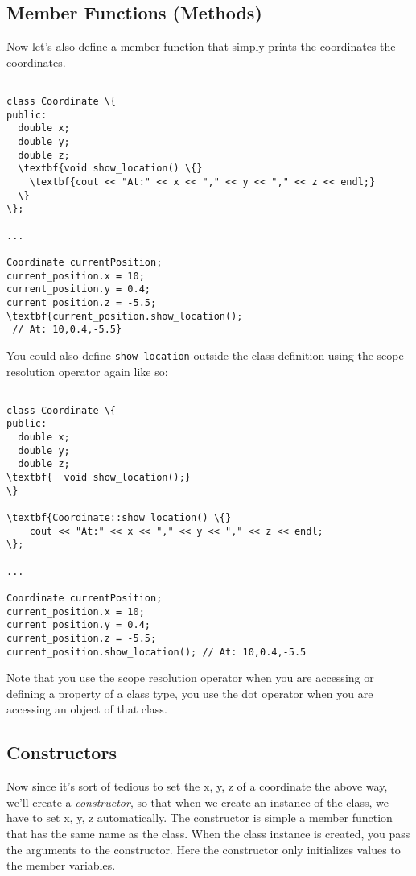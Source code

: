 \documentclass{IEEEtran}
\begin{document}
\subsection{Member Functions (Methods)}

Now let's also define a member function that simply prints the coordinates the coordinates.

\begin{Verbatim}[fontsize=\scriptsize, xleftmargin=.3in, commandchars=\\\{\}]

class Coordinate \{
public:
  double x; 
  double y;
  double z;
  \textbf{void show_location() \{}
    \textbf{cout << "At:" << x << "," << y << "," << z << endl;}
  \}
\};

...

Coordinate currentPosition;
current_position.x = 10;
current_position.y = 0.4;
current_position.z = -5.5;  
\textbf{current_position.show_location();
 // At: 10,0.4,-5.5}

\end{Verbatim}

You could also define \verb|show_location| outside the class definition using the scope resolution operator again like so:

\begin{Verbatim}[fontsize=\scriptsize, xleftmargin=.3in, commandchars=\\\{\}]

class Coordinate \{
public:
  double x; 
  double y;
  double z;
\textbf{  void show_location();}
\}

\textbf{Coordinate::show_location() \{}
    cout << "At:" << x << "," << y << "," << z << endl;
\};

...

Coordinate currentPosition;
current_position.x = 10;
current_position.y = 0.4;
current_position.z = -5.5;  
current_position.show_location(); // At: 10,0.4,-5.5

\end{Verbatim}

Note that you use the scope resolution operator when you are accessing or defining a property of a class type, you use the dot operator when you are accessing an object of that class.

\subsection{Constructors}

Now since it's sort of tedious to set the x, y, z of a coordinate the above way, we'll create a \textit{constructor}, so that when we create an instance of the class, we have to set x, y, z automatically. The constructor is simple a member function that has the same name as the class. When the class instance is created, you pass the arguments to the constructor. Here the constructor only initializes values to the member variables.
\end{document}
